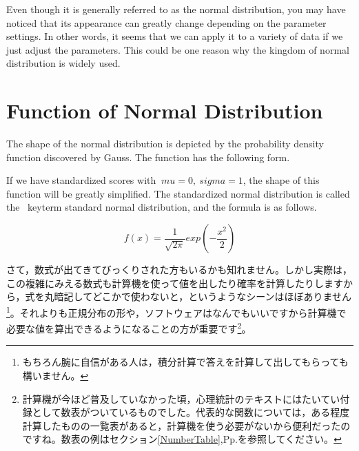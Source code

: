 \documentclass{ltjbook}
\begin{document}
Even though it is generally referred to as the normal distribution, you may have noticed that its appearance can greatly change depending on the parameter settings. In other words, it seems that we can apply it to a variety of data if we just adjust the parameters. This could be one reason why the kingdom of normal distribution is widely used.

\section{Function of Normal Distribution}

The shape of the normal distribution is depicted by the probability density function discovered by Gauss. The function has the following form.



If we have standardized scores with $\ mu = 0, \ sigma = 1 $, the shape of this function will be greatly simplified. The standardized normal distribution is called the \ keyterm {standard normal distribution}, and the formula is as follows.

\[ f(x) = \frac{1}{\sqrt{2\pi}} exp(-\frac{x^2}{2})   \]


さて，数式が出てきてびっくりされた方もいるかも知れません。しかし実際は，この複雑にみえる数式も計算機を使って値を出したり確率を計算したりしますから，式を丸暗記してどこかで使わないと，というようなシーンはほぼありません\footnote{もちろん腕に自信がある人は，積分計算で答えを計算して出してもらっても構いません。}。それよりも正規分布の形や，ソフトウェアはなんでもいいですから計算機で必要な値を算出できるようになることの方が重要です\footnote{計算機が今ほど普及していなかった頃，心理統計のテキストにはたいてい付録として数表がついているものでした。代表的な関数については，ある程度計算したものの一覧表があると，計算機を使う必要がないから便利だったのですね。数表の例はセクション\ref{NumberTable},Pp.\pageref{NumberTable}を参照してください。}。
\end{document}
